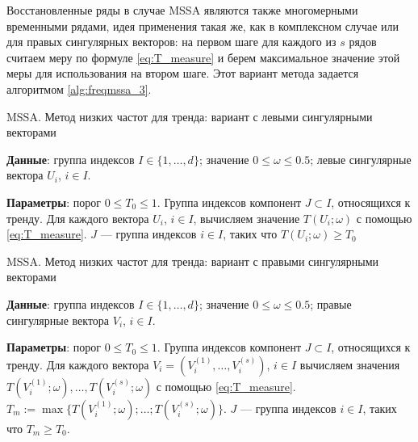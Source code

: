 \documentclass[specialist,
               substylefile = spbu.rtx,
               subf,href,colorlinks=true, 12pt]{disser}
\begin{document}
Восстановленные ряды в случае MSSA являются также многомерными временными рядами, идея применения такая же, как в комплексном случае или для правых сингулярных векторов: на первом шаге для каждого из $s$ рядов считаем меру по формуле \eqref{eq:T_measure} и берем максимальное значение этой меры для использования на втором шаге.
Этот вариант метода задается алгоритмом  \ref{alg:freqmssa_3}.

 \begin{algorithm}[!hhh]
\caption{MSSA. Метод низких частот для тренда: вариант с левыми сингулярными векторами}
\label{alg:freqmssa_1}
\begin{algorithmic}[1]
\REQUIRE 
\item \textbf{Данные}: группа индексов $I \in \{1,\ldots,d\}$; значение  $0 \leqslant  \omega \leqslant 0.5$; левые сингулярные вектора $U_i$, $i \in I$.
\item \textbf{Параметры}: порог $0 \leqslant T_0 \leqslant 1$.
\ENSURE Группа индексов компонент $J \subset I$, относящихся к тренду.
\STATE  Для каждого вектора $U_i$, $i \in I$, вычисляем значение $T(U_i; \omega)$ с помощью  \eqref{eq:T_measure}.
\STATE $J$ --- группа индексов $i \in I$, таких что $T(U_i; \omega) \geqslant T_0$
\end{algorithmic}
\end{algorithm}

\begin{algorithm}[!hhh]
\caption{MSSA. Метод низких частот для тренда: вариант с правыми сингулярными векторами}
\label{alg:freqmssa_2}
\begin{algorithmic}[1]
\REQUIRE 
\item \textbf{Данные}: группа индексов $I \in \{1,\ldots,d\}$; значение  $0 \leqslant  \omega \leqslant 0.5$; правые сингулярные вектора $V_i$, $i \in I$.
\item \textbf{Параметры}: порог $0 \leqslant T_0 \leqslant 1$.
\ENSURE Группа индексов компонент $J \subset I$, относящихся к тренду.
\STATE  Для каждого вектора ${V}_{i} = ({V}_i^{(1)}, \ldots,{V}_i^{(s)})$, $i \in I$
 вычисляем значения $T(V_i^{(1)}; \omega), \ldots,
T(V_i^{(s)}; \omega)$ с помощью  \eqref{eq:T_measure}. $T_m := \max \{T(V_i^{(1)}; \omega); \ldots;
T(V_i^{(s)}; \omega)\}$.
\STATE $J$ --- группа индексов $i \in I$, таких что $T_m \geqslant T_0$.
\end{algorithmic}
\end{algorithm}
\end{document}
